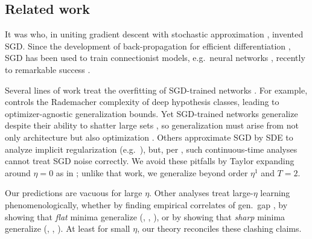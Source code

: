 \documentclass{article}
\theoremstyle{plain}
\theoremstyle{definition}
\begin{document}

\subsection{Related work} \label{sect:related}

    It was \cite{ki52} who, in uniting gradient descent \citep{ca47} with
    stochastic approximation \citep{ro51}, invented SGD.  Since the development
    of back-propagation for efficient differentiation \citep{we74}, SGD has
    been used to train connectionist models, e.g.\ neural networks
    \citep{bo91}, recently to remarkable success \citep{le15}.


    Several lines of work treat the overfitting of SGD-trained networks
    \citep{ne17a}.  For example, \cite{ba17} controls the Rademacher complexity
    of deep hypothesis classes, leading to optimizer-agnostic generalization
    bounds.  Yet SGD-trained networks generalize despite their ability to
    shatter large sets \citep{zh17}, so generalization must arise from not only
    architecture but also optimization \citep{ne17b}.  Others approximate SGD
    by SDE to analyze implicit regularization (e.g.\ \cite{ch18}), but, per
    \cite{ya19a}, such continuous-time analyses cannot treat SGD noise
    correctly.
    We avoid these pitfalls by Taylor expanding around $\eta=0$ as in
    \cite{ro18}; unlike that work, we generalize beyond order $\eta^1$ and
    $T=2$.
    

    Our predictions are vacuous for large $\eta$.  Other analyses treat
    large-$\eta$ learning phenomenologically, whether by finding empirical
    correlates of gen.\ gap \citep{li18}, by showing that \emph{flat} minima
    generalize (\cite{ho17}, \cite{ke17}, \cite{wa18}), or by showing that
    \emph{sharp} minima generalize (\cite{st56}, \cite{di17}, \cite{wu18}).
    At least for small $\eta$, our theory reconciles these clashing claims.
    
\end{document}
